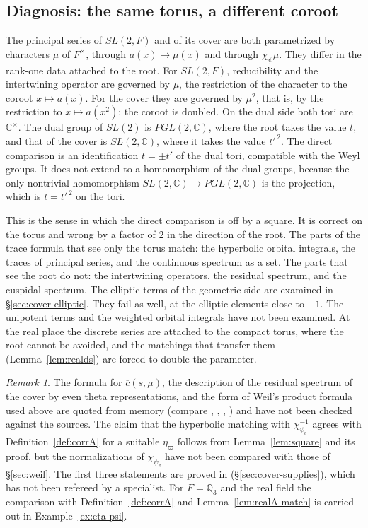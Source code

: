 \documentclass[12pt,letterpaper,openany]{book}
\theoremstyle{plain}
\theoremstyle{definition}
\theoremstyle{remark}
\theoremstyle{remark}
\newtheorem{remyy}{Remark}
\begin{document}
\subsection*{Diagnosis: the same torus, a different coroot}

The principal series of $SL(2,F)$ and of its cover are both parametrized
by characters $\mu$ of $F^\times$, through $a(x)\mapsto\mu(x)$ and through
$\chi_\psi\mu$. They differ in the rank-one data attached to the root. For
$SL(2,F)$, reducibility and the intertwining operator are governed by
$\mu$, the restriction of the character to the coroot $x\mapsto a(x)$. For
the cover they are governed by $\mu^2$, that is, by the restriction to
$x\mapsto a(x^2)$: the coroot is doubled. On the dual side both tori are
${\mathbb C}^\times$. The dual group of $SL(2)$ is $PGL(2,{\mathbb C})$,
where the root takes the value $t$, and that of the cover is
$SL(2,{\mathbb C})$, where it takes the value $t'^{\,2}$. The direct
comparison is an identification $t=\pm t'$ of the dual tori, compatible
with the Weyl groups. It does not extend to a homomorphism of the dual
groups, because the only nontrivial homomorphism
$SL(2,{\mathbb C})\rightarrow PGL(2,{\mathbb C})$ is the projection, which
is $t=t'^{\,2}$ on the tori.

This is the sense in which the direct comparison is off by a square. It is
correct on the torus and wrong by a factor of $2$ in the direction of the
root. The parts of the trace formula that see only the torus match: the
hyperbolic orbital integrals, the traces of principal series, and the
continuous spectrum as a set. The parts that see the root do not: the
intertwining operators, the residual spectrum, and the cuspidal spectrum.
The elliptic terms of the geometric side are examined in
\S\ref{sec:cover-elliptic}. They fail as well, at the elliptic elements
close to $-1$. The unipotent terms and the weighted orbital integrals
have not been examined. At the real place the discrete series
are attached to the compact torus, where the root cannot be avoided, and
the matchings that transfer them (Lemma~\ref{lem:realds}) are forced to
double the parameter.

\begin{remyy}\label{rem26:where-fails}
The formula for $\overline c(s,\mu)$, the description of the residual
spectrum of the cover by even theta representations, and the form of
Weil's product formula used above are quoted from memory (compare
\cite{GS}, \cite{GePS}, \cite{Ge2}, \cite{We3}) and have not been checked
against the sources. The claim that the hyperbolic matching with
$\chi_{\psi_v}^{-1}$ agrees with Definition~\ref{def:corrA} for a suitable
$\eta_\varpi$ follows from Lemma~\ref{lem:square} and its proof, but the
normalizations of $\chi_{\psi_v}$ have not been compared with those of
\S\ref{sec:weil}. The first three statements are proved in \cite{JC}
(\S\ref{sec:cover-supplies}), which has not been refereed by a
specialist. For $F={\mathbb Q}_3$ and the real field the comparison with
Definition~\ref{def:corrA} and Lemma~\ref{lem:realA-match} is carried out
in Example~\ref{ex:eta-psi}.
\end{remyy}
\end{document}
